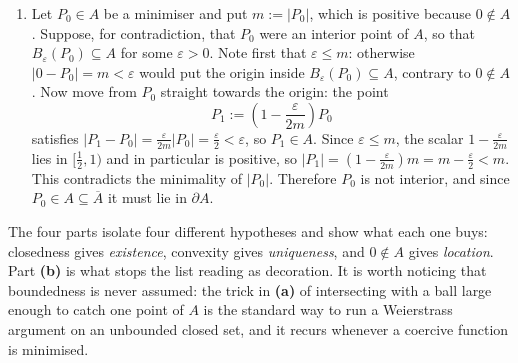 \begin{exercisesolution}
\begin{enumerate}[label=\textbf{(\alph*)}]
  \item Let $P_0 \in A$ be a minimiser and put $m := \lvert P_0\rvert$, which is positive because
    $0 \notin A$. Suppose, for contradiction, that $P_0$ were an interior point of $A$, so that
    $B_\varepsilon(P_0) \subseteq A$ for some $\varepsilon > 0$. Note first that
    $\varepsilon \le m$: otherwise $\lvert 0 - P_0\rvert = m < \varepsilon$ would put the origin
    inside $B_\varepsilon(P_0) \subseteq A$, contrary to $0 \notin A$. Now move from $P_0$ straight
    towards the origin: the point
\[P_1 := \left(1 - \frac{\varepsilon}{2m}\right) P_0\]
    satisfies $\lvert P_1 - P_0\rvert = \frac{\varepsilon}{2m}\lvert P_0\rvert = \frac{\varepsilon}{2}
    < \varepsilon$, so $P_1 \in A$. Since $\varepsilon \le m$, the scalar $1 - \frac{\varepsilon}{2m}$
    lies in $[\tfrac12, 1)$ and in particular is positive, so
    $\lvert P_1\rvert = \left(1 - \frac{\varepsilon}{2m}\right)m = m - \frac{\varepsilon}{2} < m$.
    This contradicts the minimality of $\lvert P_0\rvert$. Therefore $P_0$ is not interior, and since
    $P_0 \in A \subseteq \overline{A}$ it must lie in $\partial A$.
\end{enumerate}
\begin{remark}
The four parts isolate four different hypotheses and show what each one buys: closedness gives
\emph{existence}, convexity gives \emph{uniqueness}, and $0 \notin A$ gives \emph{location}. Part
\textbf{(b)} is what stops the list reading as decoration. It is worth noticing that boundedness is
never assumed: the trick in \textbf{(a)} of intersecting with a ball large enough to catch one
point of $A$ is the standard way to run a Weierstrass argument on an unbounded closed set, and it
recurs whenever a coercive function is minimised.
\end{remark}
\end{exercisesolution}

